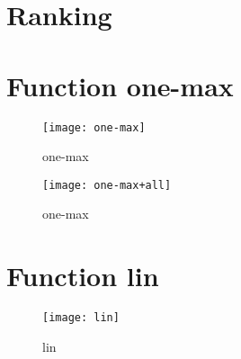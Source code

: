 \graphicspath{{../graphics/}}

\section{Ranking}

\begin{center}

\end{center}


\newpage

\section{Function one-max}

\begin{center}

\end{center}

\begin{center}

\end{center}

\begin{figure}[h]
\begin{center}
\texttt{[image: one-max]}
\caption{one-max}
\end{center}
\end{figure}

\begin{figure}[h]
\begin{center}
\texttt{[image: one-max+all]}
\caption{one-max}
\end{center}
\end{figure}

\newpage

\section{Function lin}

\begin{center}

\end{center}

\begin{center}

\end{center}

\begin{figure}[h]
\begin{center}
\texttt{[image: lin]}
\caption{lin}
\end{center}
\end{figure}

